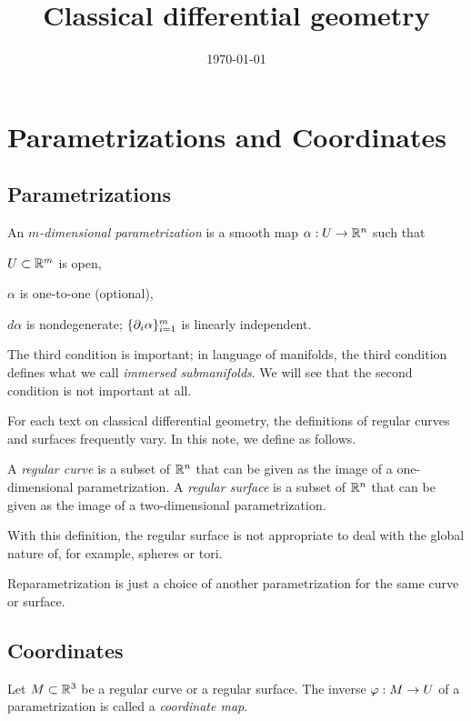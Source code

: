 \documentclass{../exp}
\title{Classical differential geometry}
\date{\today}
\def\a{\alpha}
\begin{document}
\maketitle
\tableofcontents

\section{Parametrizations and Coordinates}
\subsection{Parametrizations}
\begin{defn}
An \emph{$m$-dimensional parametrization} is a smooth map $\a:U\to\R^n$ such that
\begin{cond}
\item $U\subset\mathbb{R}^m$ is open,
\item $\a$ is one-to-one (optional),
\item $d\a$ is nondegenerate; $\{\pd_i\a\}_{i=1}^m$ is linearly independent.
\end{cond}
\end{defn}
The third condition is important; in language of manifolds, the third condition defines what we call \emph{immersed submanifolds}.
We will see that the second condition is not important at all.

For each text on classical differential geometry, the definitions of regular curves and surfaces frequently vary.
In this note, we define as follows.
\begin{defn}
A \emph{regular curve} is a subset of $\mathbb{R}^n$ that can be given as the image of a one-dimensional parametrization.
A \emph{regular surface} is a subset of $\mathbb{R}^n$ that can be given as the image of a two-dimensional parametrization.
\end{defn}
With this definition, the regular surface is not appropriate to deal with the global nature of, for example, spheres or tori.

Reparametrization is just a choice of another parametrization for the same curve or surface.



\subsection{Coordinates}
\begin{defn}
Let $M\subset\mathbb{R}^3$ be a regular curve or a regular surface.
The inverse $\f:M\to U$ of a parametrization is called a \emph{coordinate map}.
\end{defn}
\end{document}
